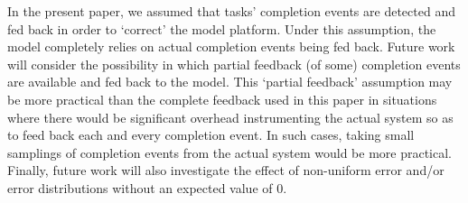 \documentclass[10pt]{csce}
\begin{document}
In the present paper, we assumed that tasks' completion events are detected
and fed back in order to `correct' the model platform.  Under this
assumption, the model completely relies on actual completion events being
fed back.  Future work will consider the possibility in which partial feedback
(of some) completion events are available and fed back to the model.  This
`partial feedback' assumption may be more practical than the complete feedback
used in this paper in situations where there would be significant overhead
instrumenting the actual system so as to feed back each and every completion
event.  In such cases, taking small samplings of completion events from the
actual system would be more practical. Finally, future work will also
investigate the effect of non-uniform error and/or error distributions without
an expected value of $0$.

{}

\end{document}
